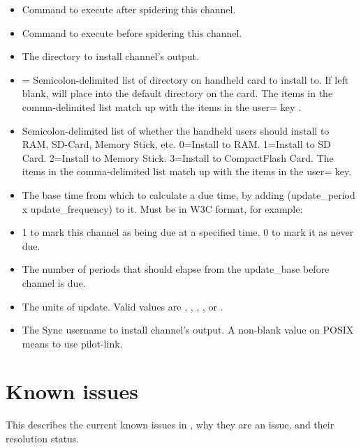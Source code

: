 \begin{helponly}
\begin{itemize}
  \item {} Command to execute after spidering this channel.
  \item {} Command to execute before spidering this channel.
  \item {} The directory to install channel's output.
  \item {}= Semicolon-delimited list of directory on handheld
    card to install to. If left blank, will place into the default directory on the 
    card. The items in the comma-delimited list match up with the items in the
    user= key \notimplemented.
  \item {} Semicolon-delimited list of whether
    the handheld users should install to RAM, SD-Card, Memory Stick, etc.
    0=Install to RAM. 1=Install to SD Card. 2=Install to Memory Stick.
    3=Install to CompactFlash Card.
    The items in the comma-delimited list match up with the items in the user= key.
  \item {} The base time from which to calculate a due time,
    by adding (update\_period x update\_frequency) to it. Must be in W3C
    format, for example: 
  \item {} 1 to mark this channel as being due at a
    specified time. 0 to mark it as never due.
  \item {} The number of periods that should elapse
    from the update\_base before channel is due.
  \item {} The units of update. Valid values are
    , , , , or
    .
  \item {} The Sync username to install channel's output. A
    non-blank value on POSIX means to use pilot-link.
\end{itemize}

\section{Known issues}\label{pd-known-issues}

This describes the current known issues in \brandingapplicationdesktopname, why they are an issue,
and their resolution status.


\end{helponly}

